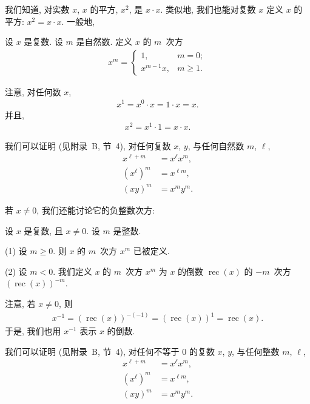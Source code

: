 \documentclass[../libro.tex]{subfiles}
\begin{document}
我们知道, 对实数 \(x\),
\(x\) 的平方, \(x^2\), 是 \(x \cdot x\).
类似地, 我们也能对复数 \(x\)
定义 \(x\) 的平方:
\(x^2 = x \cdot x\).
一般地,

\begin{definition}
    设 \(x\) 是复数.
    设 \(m\) 是自然数.
    定义 \(x\) 的 \(m\)~次方
    \begin{align*}
        x^m =
        \begin{cases}
            1,         & m = 0;    \\
            x^{m-1} x, & m \geq 1.
        \end{cases}
    \end{align*}
\end{definition}

注意, 对任何数 \(x\),
\begin{align*}
    x^1 = x^0 \cdot x = 1 \cdot x = x.
\end{align*}
并且,
\begin{align*}
    x^2 = x^1 \cdot 1 = x \cdot x.
\end{align*}

我们可以证明 (见附录~B, 节~4),
对任何复数 \(x\), \(y\),
与任何自然数 \(m\), \(\ell\),
\begin{align*}
    x^{\ell + m} & = x^\ell x^m, \\
    (x^\ell)^m   & = x^{\ell m}, \\
    (x y)^m      & = x^m y^m.
\end{align*}

若 \(x \neq 0\), 我们还能讨论它的负整数次方:

\begin{definition}
    设 \(x\) 是复数, 且 \(x \neq 0\).
    设 \(m\) 是整数.

    (1)
    设 \(m \geq 0\).
    则 \(x\) 的 \(m\)~次方 \(x^m\) 已被定义.

    (2)
    设 \(m < 0\).
    我们定义 \(x\) 的 \(m\)~次方 \(x^m\)
    为 \(x\) 的倒数 \(\operatorname{rec} {(x)}\)
    的 \(-m\)~次方 \((\operatorname{rec} {(x)})^{-m}\).
\end{definition}

注意, 若 \(x \neq 0\), 则
\begin{align*}
    x^{-1}
    = (\operatorname{rec} {(x)})^{-(-1)}
    = (\operatorname{rec} {(x)})^{1}
    = \operatorname{rec} {(x)}.
\end{align*}
于是, 我们也用 \(x^{-1}\) 表示 \(x\) 的倒数.

我们可以证明 (见附录~B, 节~4),
对任何不等于 \(0\) 的复数 \(x\), \(y\),
与任何整数 \(m\), \(\ell\),
\begin{align*}
    x^{\ell + m} & = x^\ell x^m, \\
    (x^\ell)^m   & = x^{\ell m}, \\
    (x y)^m      & = x^m y^m.
\end{align*}
\end{document}
